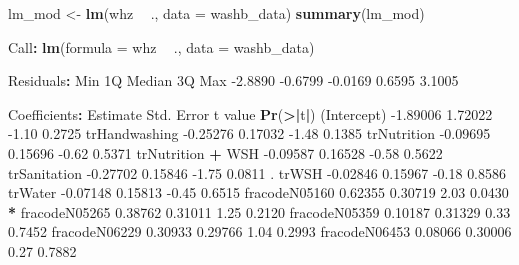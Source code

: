 \documentclass[12pt, krantz2,]{krantz}
\newenvironment{Shaded}{\begin{snugshade}}{\end{snugshade}}
\newcommand{\DataTypeTok}[1]{\textcolor[rgb]{0.27,0.27,0.27}{#1}}
\newcommand{\ErrorTok}[1]{\textcolor[rgb]{0.14,0.14,0.14}{\textbf{#1}}}
\newcommand{\FloatTok}[1]{\textcolor[rgb]{0.06,0.06,0.06}{#1}}
\newcommand{\KeywordTok}[1]{\textcolor[rgb]{0.27,0.27,0.27}{\textbf{#1}}}
\newcommand{\NormalTok}[1]{#1}
\newcommand{\OperatorTok}[1]{\textcolor[rgb]{0.43,0.43,0.43}{\textbf{#1}}}
\newcommand{\StringTok}[1]{\textcolor[rgb]{0.5,0.5,0.5}{#1}}
\theoremstyle{definition}
\theoremstyle{definition}
\theoremstyle{definition}
\newcommand{\1}{\mathbbm{1}}
\begin{document}
\begin{Shaded}
\begin{Highlighting}[]
\NormalTok{lm_mod <-}\StringTok{ }\KeywordTok{lm}\NormalTok{(whz }\OperatorTok{~}\StringTok{ }\NormalTok{., }\DataTypeTok{data =}\NormalTok{ washb_data)}
\KeywordTok{summary}\NormalTok{(lm_mod)}

\NormalTok{Call}\OperatorTok{:}
\KeywordTok{lm}\NormalTok{(}\DataTypeTok{formula =}\NormalTok{ whz }\OperatorTok{~}\StringTok{ }\NormalTok{., }\DataTypeTok{data =}\NormalTok{ washb_data)}

\NormalTok{Residuals}\OperatorTok{:}
\StringTok{    }\NormalTok{Min      1Q  Median      3Q     Max }
\FloatTok{-2.8890} \FloatTok{-0.6799} \FloatTok{-0.0169}  \FloatTok{0.6595}  \FloatTok{3.1005} 

\NormalTok{Coefficients}\OperatorTok{:}
\StringTok{                                }\NormalTok{Estimate Std. Error t value }\KeywordTok{Pr}\NormalTok{(}\OperatorTok{>}\ErrorTok{|}\NormalTok{t}\OperatorTok{|}\NormalTok{)   }
\NormalTok{(Intercept)                     }\FloatTok{-1.89006}    \FloatTok{1.72022}   \FloatTok{-1.10}   \FloatTok{0.2725}   
\NormalTok{trHandwashing                   }\FloatTok{-0.25276}    \FloatTok{0.17032}   \FloatTok{-1.48}   \FloatTok{0.1385}   
\NormalTok{trNutrition                     }\FloatTok{-0.09695}    \FloatTok{0.15696}   \FloatTok{-0.62}   \FloatTok{0.5371}   
\NormalTok{trNutrition }\OperatorTok{+}\StringTok{ }\NormalTok{WSH               }\FloatTok{-0.09587}    \FloatTok{0.16528}   \FloatTok{-0.58}   \FloatTok{0.5622}   
\NormalTok{trSanitation                    }\FloatTok{-0.27702}    \FloatTok{0.15846}   \FloatTok{-1.75}   \FloatTok{0.0811}\NormalTok{ . }
\NormalTok{trWSH                           }\FloatTok{-0.02846}    \FloatTok{0.15967}   \FloatTok{-0.18}   \FloatTok{0.8586}   
\NormalTok{trWater                         }\FloatTok{-0.07148}    \FloatTok{0.15813}   \FloatTok{-0.45}   \FloatTok{0.6515}   
\NormalTok{fracodeN05160                    }\FloatTok{0.62355}    \FloatTok{0.30719}    \FloatTok{2.03}   \FloatTok{0.0430} \OperatorTok{*}\StringTok{ }
\NormalTok{fracodeN05265                    }\FloatTok{0.38762}    \FloatTok{0.31011}    \FloatTok{1.25}   \FloatTok{0.2120}   
\NormalTok{fracodeN05359                    }\FloatTok{0.10187}    \FloatTok{0.31329}    \FloatTok{0.33}   \FloatTok{0.7452}   
\NormalTok{fracodeN06229                    }\FloatTok{0.30933}    \FloatTok{0.29766}    \FloatTok{1.04}   \FloatTok{0.2993}   
\NormalTok{fracodeN06453                    }\FloatTok{0.08066}    \FloatTok{0.30006}    \FloatTok{0.27}   \FloatTok{0.7882}   

\end{Highlighting}
\end{Shaded}
\end{document}

